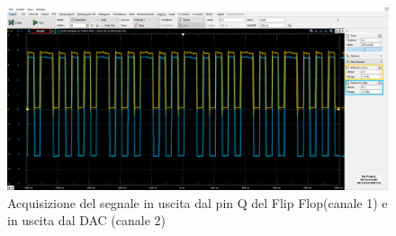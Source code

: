 \documentclass[10pt, a4paper, italian]{article}
\begin{document}
\begin{figure}[htbp]
    \centering
	\includegraphics[width=\textwidth]{MIDDLE.U3vU4}
    \caption{Acquisizione del segnale in uscita dal pin Q del Flip Flop(canale 1) e in uscita dal DAC (canale 2)}
\end{figure}
\end{document}
